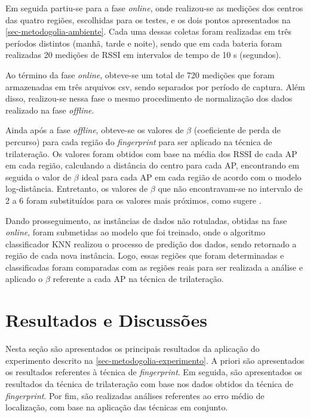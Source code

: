\documentclass[12pt]{artigoifce}
\begin{document}
Em seguida partiu-se para a fase \textit{online}, onde realizou-se as medições dos centros das quatro regiões, escolhidas para os testes, e os dois pontos apresentados na \autoref{sec-metodogolia-ambiente}. Cada uma dessas coletas foram realizadas em três períodos distintos (manhã, tarde e noite), sendo que em cada bateria foram realizadas 20 medições de RSSI em intervalos de tempo de 10 s (segundos).

Ao término da fase \textit{online}, obteve-se um total de 720 medições que foram armazenadas em três arquivos csv, sendo separados por período de captura. Além disso, realizou-se nessa fase o mesmo procedimento de normalização dos dados realizado na fase \textit{offline}.

Ainda após a fase \textit{offline}, obteve-se os valores de $\beta$ (coeficiente de perda de percurso) para cada região do \textit{fingerprint} para ser aplicado na técnica de trilateração. Os valores foram obtidos com base na média dos RSSI de cada AP em cada região, calculando a distância do centro para cada AP, encontrando em seguida o valor de $\beta$ ideal para cada AP em cada região de acordo com o modelo log-distância. Entretanto, os valores de $\beta$ que não encontravam-se no intervalo de 2 a 6 foram substituídos para os valores mais próximos, como sugere . 

Dando prosseguimento, as instâncias de dados não rotuladas, obtidas na fase \textit{online}, foram submetidas ao modelo que foi treinado, onde o algoritmo classificador KNN realizou o processo de predição dos dados, sendo retornado a região de cada nova instância. Logo, essas regiões que foram determinadas e classificadas foram comparadas com as regiões reais para ser realizada a análise e aplicado o $\beta$ referente a cada AP na técnica de trilateração.

\section{Resultados e Discussões}
\label{sec-resultados}

Nesta seção são apresentados os principais resultados da aplicação do experimento descrito na \autoref{sec-metodogolia-experimento}. A priori são apresentados os resultados referentes à técnica de \textit{fingerprint}. Em seguida, são apresentados os resultados da técnica de trilateração com base nos dados obtidos da técnica de \textit{fingerprint}. Por fim, são realizadas análises referentes ao erro médio de localização, com base na aplicação das técnicas em conjunto.
\end{document}
